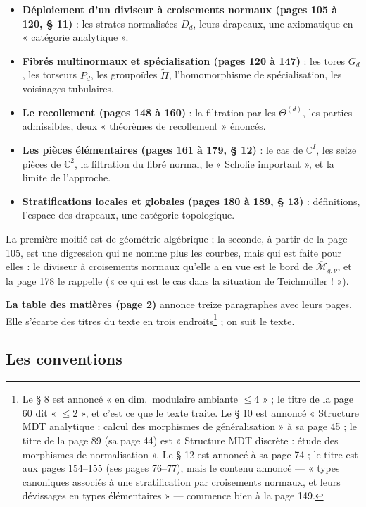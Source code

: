 \documentclass[11pt,a4paper]{article}
\begin{document}
\begin{itemize}
{§ 10)} : couper des arêtes, oublier des points ; le Programme.
\item \textbf{Déploiement d'un diviseur à croisements normaux (pages 105 à 120,
§ 11)} : les strates normalisées $D_d$, leurs drapeaux, une axiomatique en
« catégorie analytique ».
\item \textbf{Fibrés multinormaux et spécialisation (pages 120 à 147)} : les
tores $G_d$, les torseurs $P_d$, les groupoïdes $\widetilde{\Pi}$, l'homomorphisme
de spécialisation, les voisinages tubulaires.
\item \textbf{Le recollement (pages 148 à 160)} : la filtration par les
$\Theta^{(d)}$, les parties admissibles, deux « théorèmes de recollement »
énoncés.
\item \textbf{Les pièces élémentaires (pages 161 à 179, § 12)} : le cas de
$\mathbb{C}^I$, les seize pièces de $\mathbb{C}^2$, la filtration du fibré
normal, le « Scholie important », et la limite de l'approche.
\item \textbf{Stratifications locales et globales (pages 180 à 189, § 13)} :
définitions, l'espace des drapeaux, une catégorie topologique.
\end{itemize}

La première moitié est de géométrie algébrique ; la seconde, à partir de la page
105, est une digression qui ne nomme plus les courbes, mais qui est faite pour
elles : le diviseur à croisements normaux qu'elle a en vue est le bord de
$\overline{\mathcal{M}}_{g,\nu}$, et la page 178 le rappelle (« ce qui est le
cas dans la situation de Teichmüller ! »).

\textbf{La table des matières (page 2)} annonce treize paragraphes avec leurs
pages. Elle s'écarte des titres du texte en trois endroits\footnote{Le § 8 est
annoncé « en dim.\ modulaire ambiante $\leq 4$ » ; le titre de la page 60 dit
« $\leq 2$ », et c'est ce que le texte traite. Le § 10 est annoncé « Structure
MDT analytique : calcul des morphismes de généralisation » à sa page 45 ; le
titre de la page 89 (sa page 44) est « Structure MDT discrète : étude des
morphismes de normalisation ». Le § 12 est annoncé à sa page 74 ; le titre est
aux pages 154--155 (ses pages 76--77), mais le contenu annoncé — « types
canoniques associés à une stratification par croisements normaux, et leurs
dévissages en types élémentaires » — commence bien à la page 149.} ; on suit le
texte.

\subsection*{Les conventions}
\end{document}
